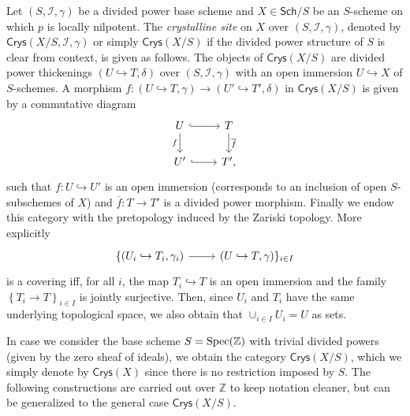 \begin{defn}
	Let $\left(S, \mathcal{I}, \gamma\right)$ be a divided power base scheme
	and $X \in \mathsf{Sch}/S$ be an \(S\)-scheme on which \(p\) is locally nilpotent.
	The \emph{crystalline site} on $X$ over $\left(S, \mathcal{I}, \gamma\right)$,
	denoted by $\mathsf{Crys}(X/S, \mathcal{I}, \gamma)$ or simply
	$\mathsf{Crys}(X/S)$ if the divided power structure of $S$ 
	is clear from context, is given as follows.
	The objects of $\mathsf{Crys}(X/S)$ are
	divided power thickenings $\left(U \hookrightarrow T, \delta\right)$ over 
	$\left(S, \mathcal{I}, \gamma\right)$
	with an open immersion $U \hookrightarrow X$ of $S$-schemes.
	A morphism $f\colon \left(U \hookrightarrow T, \gamma\right)
	\to \left(U' \hookrightarrow T', \delta\right)$ in \(\mathsf{Crys}(X/S)\)
	is given by a commutative diagram
	\begin{equation}\label{diag:MorphDivPowers}
	\begin{tikzcd}
		U \arrow[d, "f"', rightarrow] \arrow[r, "", hookrightarrow] &
		T \arrow[d, "\overline{f}", rightarrow] \\
		U' \arrow[r, "", hookrightarrow] &
		T'
	,\end{tikzcd}
	\end{equation}
	such that $f\colon U \hookrightarrow U'$ is an open immersion (corresponds to
	an inclusion of open $S$-subschemes of $X$) and
	$\overline{f}\colon T \to T'$ is a divided power morphism.
	Finally we endow this category with the pretopology induced by the
	Zariski topology.
	More explicitly 
	\begin{equation*}
	\begin{tikzcd}
		\{ \left(U_i \hookrightarrow T_i, \gamma_i\right)
		\arrow[r, "", rightarrow] &
		\left(U \hookrightarrow T, \gamma\right) \}_{i \in I}
	\end{tikzcd}
	\end{equation*}
	is a covering iff, for all $i$, the map
	$T_i \hookrightarrow T$ is an open immersion and
	the family $\left\{ T_i \to T \right\}_{i \in I}$
	is jointly surjective.
	Then, since $U_i$ and $T_i$ have the same underlying topological space,
	we also obtain that $\cup_{i \in I} U_i = U$ as sets.
\end{defn}


\begin{ntt}[]
	In case we consider the base scheme $S = \operatorname{Spec}(\mathbb{Z})$
	with trivial divided powers (given by the zero sheaf of ideals),
	we obtain the category $\mathsf{Crys}(X/S)$, which
	we simply denote by $\mathsf{Crys}(X)$ since there is no
	restriction imposed by $S$.
	The following constructions are carried out over $\mathbb{Z}$ to
	keep notation cleaner, but can be generalized to the general case $\mathsf{Crys}(X/S)$.
\end{ntt}


